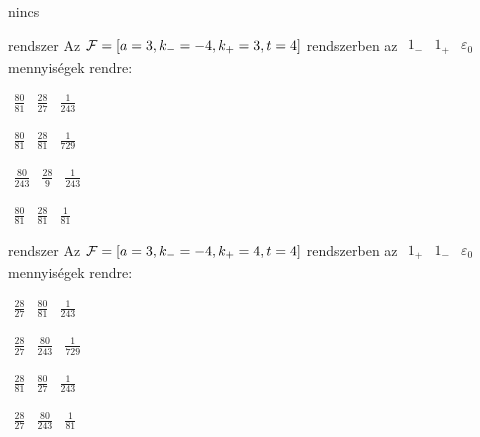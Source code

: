 \documentclass[12pt]{article}
\begin{document}
\begin{quiz}{nincs}
\begin{multi}{rendszer}
Az $  {\cal F}=\left[ a=3, k_{-}=-4, k_{+}=3, t=4 \right]  $ rendszerben az $ \begin{array}{ccc}1_{-}& 1_{+}& \varepsilon_{0}\end{array} $ mennyiségek rendre: 
\item* $ \begin{array}{ccc}\frac{80}{81}& \frac{28}{27}& \frac{1}{243}\end{array} $
\item  $ \begin{array}{ccc}\frac{80}{81}& \frac{28}{81}& \frac{1}{729}\end{array} $
\item  $ \begin{array}{ccc}\frac{80}{243}& \frac{28}{9}& \frac{1}{243}\end{array} $
\item  $ \begin{array}{ccc}\frac{80}{81}& \frac{28}{81}& \frac{1}{81}\end{array} $
\end{multi}

\begin{multi}{rendszer}
Az $  {\cal F}=\left[ a=3, k_{-}=-4, k_{+}=4, t=4 \right]  $ rendszerben az $ \begin{array}{ccc}1_{+}& 1_{-}& \varepsilon_{0}\end{array} $ mennyiségek rendre: 
\item* $ \begin{array}{ccc}\frac{28}{27}& \frac{80}{81}& \frac{1}{243}\end{array} $
\item  $ \begin{array}{ccc}\frac{28}{27}& \frac{80}{243}& \frac{1}{729}\end{array} $
\item  $ \begin{array}{ccc}\frac{28}{81}& \frac{80}{27}& \frac{1}{243}\end{array} $
\item  $ \begin{array}{ccc}\frac{28}{27}& \frac{80}{243}& \frac{1}{81}\end{array} $
\end{multi}\end{quiz}
\end{document}
